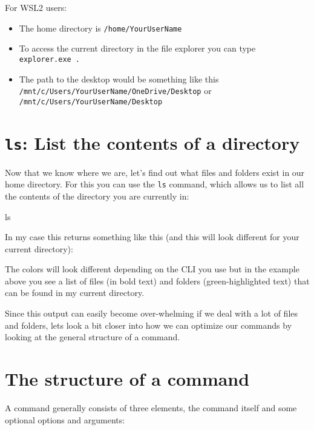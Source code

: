 \documentclass[
  letterpaper,
  DIV=11,
  numbers=noendperiod]{scrreprt}
\newenvironment{Shaded}{}{}
\newcommand{\FunctionTok}[1]{\textcolor[rgb]{0.44,0.26,0.76}{#1}}
\providecommand{\tightlist}{%
  \setlength{\itemsep}{0pt}\setlength{\parskip}{0pt}}\usepackage{longtable,booktabs,array}
\begin{document}
\begin{tcolorbox}
For WSL2 users:

\begin{itemize}
\tightlist
\item
  The home directory is \texttt{/home/YourUserName}
\item
  To access the current directory in the file explorer you can type
  \texttt{explorer.exe\ .}
\item
  The path to the desktop would be something like this
  \texttt{/mnt/c/Users/YourUserName/OneDrive/Desktop} or
  \texttt{/mnt/c/Users/YourUserName/Desktop}
\end{itemize}

\end{tcolorbox}

\section{\texorpdfstring{\texttt{ls}: List the contents of a
directory}{ls: List the contents of a directory}}\label{ls-list-the-contents-of-a-directory}

Now that we know where we are, let's find out what files and folders
exist in our home directory. For this you can use the \texttt{ls}
command, which allows us to list all the contents of the directory you
are currently in:

\begin{Shaded}
\begin{Highlighting}[]
\FunctionTok{ls}
\end{Highlighting}
\end{Shaded}

In my case this returns something like this (and this will look
different for your current directory):

The colors will look different depending on the CLI you use but in the
example above you see a list of files (in bold text) and folders
(green-highlighted text) that can be found in my current directory.

Since this output can easily become over-whelming if we deal with a lot
of files and folders, lets look a bit closer into how we can optimize
our commands by looking at the general structure of a command.

\section{The structure of a command}\label{the-structure-of-a-command}

A command generally consists of three elements, the command itself and
some optional options and arguments:
\end{document}
